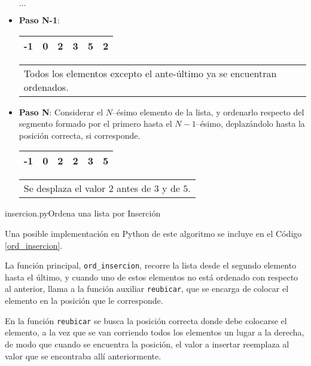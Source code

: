 \begin{itemize}
$\dots$\\

\item {\bf Paso N-1}: \\

\hspace{0.75cm}
\begin{tabular}[c]{|c|c|c|c|c|c|}
\hline
-1& 0&2&3&5&2\\
\hline
\end{tabular}
\hspace{0.75cm}
\begin{tabular}{p{9cm}}
Todos los elementos excepto el ante-último ya se encuentran ordenados.
\end{tabular}

\item {\bf Paso N}:
Considerar el $N$--ésimo elemento de la lista, y ordenarlo respecto del
segmento formado por el primero hasta el $N-1$--ésimo, deplazándolo hasta
la posición correcta, si corresponde. \\

\hspace{0.75cm}
\begin{tabular}[c]{|c|c|c|c|c|c|}
\hline
-1& 0&2&2&3&5\\
\hline
\end{tabular}
\hspace{0.75cm}
\begin{tabular}{p{9cm}}
Se desplaza el valor $2$ antes de $3$ y de $5$.
\end{tabular}

\end{itemize}

\begin{codigo}{insercion.py}{Ordena una lista por Inserción}
\label{ord_insercion}

\end{codigo}

Una posible implementación en Python de este algoritmo se incluye en el
Código \ref{ord_insercion}.

La función principal, \lstinline!ord_insercion!, recorre la lista desde el
segundo elemento hasta el último, y cuando uno de estos elementos no está
ordenado con respecto al anterior, llama a la función auxiliar
\lstinline!reubicar!, que se encarga de colocar el elemento en la posición
que le corresponde.

En la función \lstinline!reubicar! se busca la posición correcta donde debe
colocarse el elemento, a la vez que se van corriendo todos los elementos un
lugar a la derecha, de modo que cuando se encuentra la posición, el valor a
insertar reemplaza al valor que se encontraba allí anteriormente.

